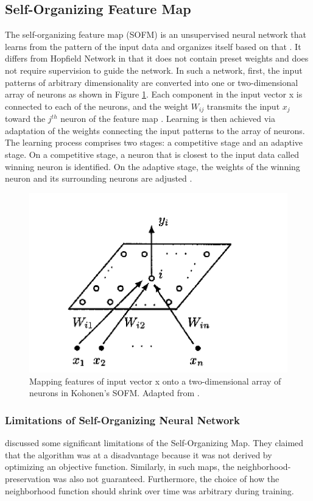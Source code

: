 \documentclass{article}
\begin{document}
\subsection{Self-Organizing Feature Map}
The self-organizing feature map (SOFM) is an unsupervised neural network that learns from the pattern of the input data and organizes itself based on that \cite{kohonen1982self}. It differs from Hopfield Network in that it does not contain preset weights and does not require supervision to guide the network. In such a network, first, the input patterns of arbitrary dimensionality are converted into one or two-dimensional array of neurons as shown in Figure \ref{fig:self-organizing-map}. Each component in the input vector x is connected to each of the neurons, and the weight $W_{ij}$ transmits the input $x_j$ toward the $j^{th}$ neuron of the feature map \cite{smith1999neural}. Learning is then achieved via adaptation of the weights connecting the input patterns to the array of neurons. The learning process comprises two stages: a competitive stage and an adaptive stage. On a competitive stage, a neuron that is closest to the input data called winning neuron \cite{smith1999neural} is identified. On the adaptive stage, the weights of the winning neuron and its surrounding neurons are adjusted \cite{kohonen1982self}.   
\begin{figure}
    \centering
    \includegraphics{images/self-organizing-map.png}
    \caption{Mapping features of input vector x onto a two-dimensional array of neurons in Kohonen's SOFM. Adapted from \cite{smith1999neural}.}
    \label{fig:self-organizing-map}
\end{figure}

\subsubsection{Limitations of Self-Organizing Neural Network}
\cite{bishop1997gtm} discussed some significant limitations of the Self-Organizing Map. They claimed that the algorithm was at a disadvantage because it was not derived by optimizing an objective function. Similarly, in such maps, the neighborhood-preservation was also not guaranteed. Furthermore, the choice of how the neighborhood function should shrink over time was arbitrary during training.
\end{document}
